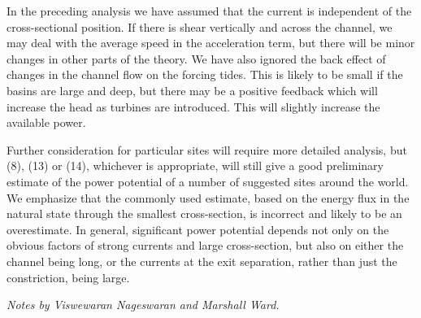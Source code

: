\documentclass[11pt]{article}
\begin{document}
In the preceding analysis we have assumed that the current is independent of the cross-sectional position. If there is shear vertically and across the channel, we may deal with the average speed in the acceleration term, but there will be minor changes in other parts of the theory. We have also ignored the back effect of changes in the channel flow on the forcing tides. This is likely to be small if the basins are large and deep, but there may be a positive feedback which will increase the head as turbines are introduced. This will slightly increase the available power.

Further consideration for particular sites will require more detailed analysis, but (8), (13) or (14), whichever is appropriate, will still give a good preliminary estimate of the power potential of a number of suggested sites around the world. We emphasize that the commonly used estimate, based on the energy flux in the natural state through the smallest cross-section, is incorrect and likely to be an overestimate.  In general, significant power potential depends not only on the  obvious factors of strong currents and large cross-section, but also on either the channel being long, or the currents at the exit separation, rather than just the constriction, being large.

\noindent \emph{Notes by Viswewaran Nageswaran and Marshall Ward.}



%
\end{document}
